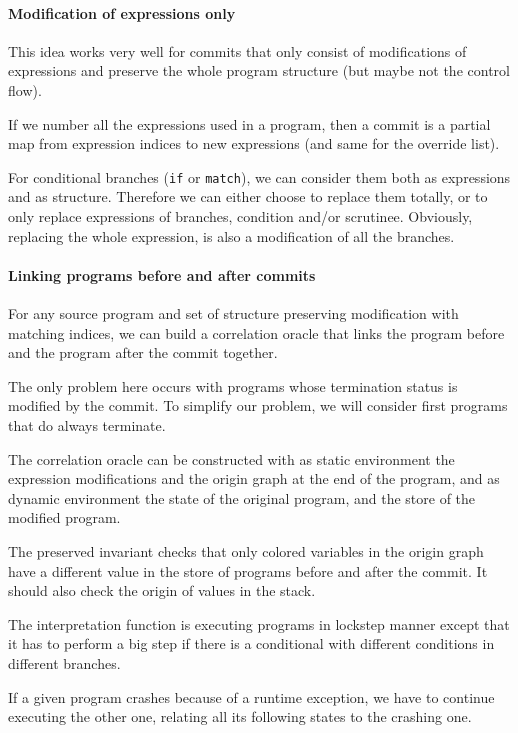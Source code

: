 \documentclass[a4paper,10pt]{article}
\begin{document}
\paragraph{Modification of expressions only} This idea works very well for commits that only consist of modifications of expressions and preserve the whole program structure (but maybe not the control flow).

If we number all the expressions used in a program, then a commit is a partial map from expression indices to new expressions (and same for the override list).

For conditional branches (\lstinline$if$ or \lstinline$match$), we can consider them both as expressions and as structure. Therefore we can either choose to replace them totally, or to only replace expressions of branches, condition and/or scrutinee.
Obviously, replacing the whole expression, is also a modification of all the branches.

\paragraph{Linking programs before and after commits} For any source program and set of structure preserving modification with matching indices, we can build a correlation oracle that links the program before and the program after the commit together.

The only problem here occurs with programs whose termination status is modified by the commit. To simplify our problem, we will consider first programs that do always terminate.

The correlation oracle can be constructed with as static environment the expression modifications and the origin graph at the end of the program, and as dynamic environment the state of the original program, and the store of the modified program.

The preserved invariant checks that only colored variables in the origin graph have a different value in the store of programs before and after the commit. It should also check the origin of values in the stack.

The interpretation function is executing programs in lockstep manner except that it has to perform a big step if there is a conditional with different conditions in different branches.

If a given program crashes because of a runtime exception, we have to continue executing the other one, relating all its following states to the crashing one.
\end{document}
